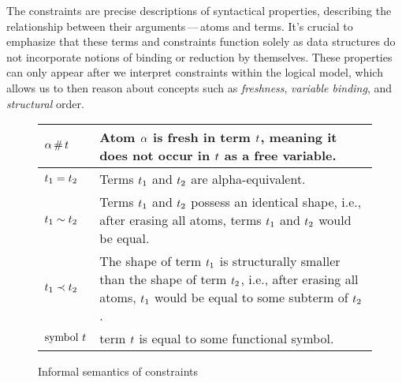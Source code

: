 \documentclass[english, mgr]{iithesis}
\renewcommand{\it}[1]{\textit{#1}}
\newcommand{\mdash}{\,---\,}
\def\-{{\mdash}}
\begin{document}
The constraints are precise descriptions of syntactical properties,
describing the relationship between their arguments\-atoms and terms.
It's crucial to emphasize that these terms and constraints function
solely as data structures do not incorporate notions of binding or reduction by themselves.
These properties can only appear after we interpret
constraints within the logical model, which allows us to then reason about
concepts such as \it{freshness}, \it{variable binding}, and \it{structural} order.
\begin{figure}[htbp]
  \centering
  \begin{tabularx}{\linewidth}{|l|X|}
    \hline
    $\alpha \,\#\, t$ & Atom $\alpha$ is fresh in term $t$, meaning it does not occur in $t$ as a free variable. \\
    \hline
    $t_1 = t_2$ & Terms $t_1$ and $t_2$ are alpha-equivalent. \\
    \hline
    $t_1 \sim t_2$ & Terms $t_1$ and $t_2$ possess an identical shape, i.e., after erasing all atoms, terms $t_1$ and $t_2$ would be equal. \\
    \hline
    $t_1 \prec t_2$ & The shape of term $t_1$ is structurally smaller than the shape of term $t_2$, i.e., after erasing all atoms, $t_1$ would be equal to some subterm of $t_2$. \\
    \hline
    $\text{symbol } t$ & term $t$ is equal to some functional symbol. \\
    \hline
  \end{tabularx}
  \caption{Informal semantics of constraints}
  \label{fig:informal-constraints-semantics}
\end{figure}
\end{document}
